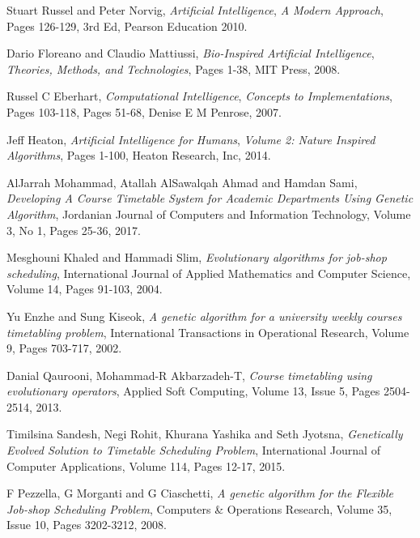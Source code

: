 \documentclass[a4paper, 12pt, titlepage]{article}
\begin{document}
\begin{thebibliography}{10}


  Stuart Russel and Peter Norvig,
  \textit{Artificial Intelligence},
  \textit{A Modern Approach},
  Pages 126-129, 
  3rd Ed, 
  Pearson Education
  2010.

  Dario Floreano and Claudio Mattiussi,
  \textit{Bio-Inspired Artificial Intelligence},
  \textit{Theories, Methods, and Technologies},
  Pages 1-38,
  MIT Press,
  2008.

  Russel C Eberhart,
  \textit{Computational Intelligence},
  \textit{Concepts to Implementations},
  Pages 103-118,
  Pages 51-68,
  Denise E M Penrose,
  2007.

  Jeff Heaton,
  \textit{Artificial Intelligence for Humans},
  \textit{Volume 2: Nature Inspired Algorithms},
  Pages 1-100,
  Heaton Research, Inc,
  2014.


  AlJarrah Mohammad, Atallah AlSawalqah Ahmad and Hamdan Sami, 
  \textit{Developing A Course Timetable System for Academic Departments Using Genetic Algorithm},
  Jordanian Journal of Computers and Information Technology,
  Volume 3,
  No 1,
  Pages 25-36,
  2017.

  Mesghouni Khaled and Hammadi Slim,
  \textit{Evolutionary algorithms for job-shop scheduling}, 
  International Journal of Applied Mathematics and Computer Science,
  Volume 14,
  Pages 91-103,
  2004.

  Yu Enzhe and Sung Kiseok, 
  \textit{A genetic algorithm for a university weekly courses timetabling problem}, 
  International Transactions in Operational Research,
  Volume 9,
  Pages 703-717,
  2002.

  Danial Qaurooni, Mohammad-R Akbarzadeh-T,
  \textit{Course timetabling using evolutionary operators},
  Applied Soft Computing,
  Volume 13, 
  Issue 5,
  Pages 2504-2514,
  2013.

  Timilsina Sandesh, Negi Rohit, Khurana Yashika and Seth Jyotsna,
  \textit{Genetically Evolved Solution to Timetable Scheduling Problem},
  International Journal of Computer Applications,
  Volume 114,
  Pages 12-17,
  2015.

  F Pezzella, G Morganti and G Ciaschetti,
  \textit{A genetic algorithm for the Flexible Job-shop Scheduling Problem},
  Computers \& Operations Research,
  Volume 35, 
  Issue 10,
  Pages 3202-3212,
  2008.


\end{thebibliography}
\end{document}
